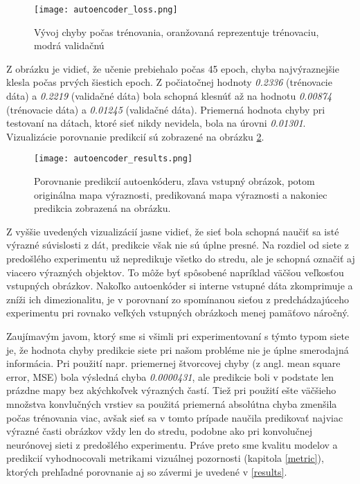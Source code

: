 \begin{figure}[H]
	\begin{center}\texttt{[image: autoencoder\_loss.png]}
		\caption[Vývoj chyby počas trénovania autoenkóderu]{
			Vývoj chyby počas trénovania, oranžovaná reprezentuje trénovaciu, modrá validačnú 
		}\label{autoencoder_loss}
	\end{center}
\end{figure}

Z obrázku je vidieť, že učenie prebiehalo počas 45 epoch, chyba najvýraznejšie klesla počas prvých šiestich epoch. Z počiatočnej hodnoty \textit{0.2336} (trénovacie dáta) a \textit{0.2219} (validačné dáta) bola schopná klesnúť až na hodnotu \textit{0.00874} (trénovacie dáta) a \textit{0.01245} (validačné dáta). Priemerná hodnota chyby pri testovaní na dátach, ktoré sieť nikdy nevidela, bola na úrovni \textit{0.01301}. Vizualizácie porovnanie predikcií sú zobrazené na obrázku \ref{autoencoder_results}.

\begin{figure}[H]
	\begin{center}\texttt{[image: autoencoder\_results.png]}
		\caption[Porovnanie predikcií autoenkóderu voči reálnym mapám výraznosti]{
			Porovnanie predikcií autoenkóderu, zľava vstupný obrázok, potom originálna mapa výraznosti, predikovaná mapa výraznosti a nakoniec predikcia zobrazená na obrázku. 
		}\label{autoencoder_results}
	\end{center}
\end{figure}

Z vyššie uvedených vizualizácií jasne vidieť, že sieť bola schopná naučiť sa isté výrazné súvislosti z dát, predikcie však nie sú úplne presné. Na rozdiel od siete z predošlého experimentu už nepredikuje všetko do stredu, ale je schopná označiť aj viacero výrazných objektov. To môže byť spôsobené napríklad väčšou veľkosťou vstupných obrázkov. Nakoľko autoenkóder si interne vstupné dáta zkomprimuje a zníži ich dimezionalitu, je v porovnaní zo spomínanou sieťou z predchádzajúceho experimentu pri rovnako veľkých vstupných obrázkoch menej pamäťovo náročný.

Zaujímavým javom, ktorý sme si všimli pri experimentovaní s týmto typom siete je, že hodnota chyby predikcie siete pri našom probléme nie je úplne smerodajná informácia. Pri použití napr. priemernej štvorcovej chyby (z angl. mean square error, MSE) bola výsledná chyba \textit{0.0000431}, ale predikcie boli v podstate len prázdne mapy bez akýchkoľvek výrazných častí. Tiež pri použití ešte väčšieho množstva konvlučných vrstiev sa použitá priemerná absolútna chyba zmenšila počas trénovania viac, avšak sieť sa v tomto prípade naučila predikovať najviac výrazné časti obrázkov vždy len do stredu, podobne ako pri konvolučnej neurónovej sieti z predošlého experimentu. Práve preto sme kvalitu modelov a predikcií vyhodnocovali metrikami vizuálnej pozornosti (kapitola \ref{metric}), ktorých prehľadné porovnanie aj so závermi je uvedené v \ref{results}.

